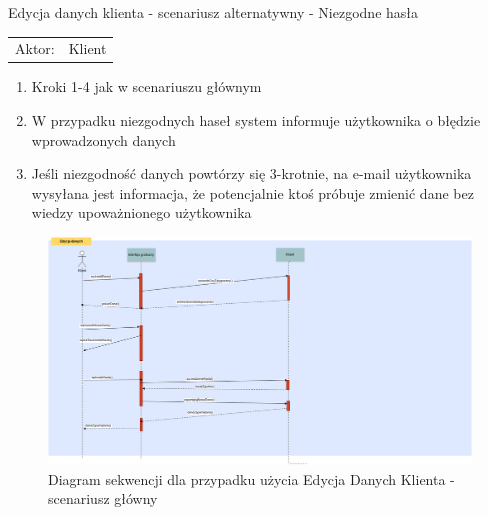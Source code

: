   
   \item Edycja danych klienta - scenariusz alternatywny - Niezgodne hasła\\
  \begin{tabularx}{\linewidth}{ c X }
  Aktor: & Klient \\
  \end{tabularx}
  \begin{enumerate}
    \item Kroki 1-4 jak w scenariuszu głównym
    \item W przypadku niezgodnych haseł system informuje użytkownika o błędzie
    wprowadzonych danych
    \item Jeśli niezgodność danych powtórzy się 3-krotnie, na e-mail użytkownika
    wysyłana jest informacja, że potencjalnie ktoś próbuje zmienić dane bez
    wiedzy upoważnionego użytkownika
  \end{enumerate}
  
  
  
  \begin{figure}[H]
    \includegraphics[width=\textwidth,
    height=0.5\textheight]{graphics/UseCase/Klient/EdycjaDanychKlientaSD.png}
  \caption{Diagram sekwencji dla przypadku użycia Edycja Danych Klienta -
  scenariusz główny}
\end{figure}